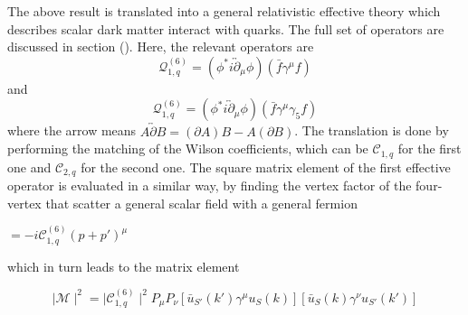 \documentclass[12pt]{article}
\begin{document}
The above result is translated into a general relativistic effective theory which describes scalar dark matter interact with quarks. The full set of operators are discussed in section (). Here, the relevant operators are
$$
\mathcal Q_{1,q}^{(6)} = (\phi^* i \overleftrightarrow\partial_\mu \phi ) ( \bar f \gamma^\mu f ) 
$$
and 
$$
\mathcal Q_{1,q}^{(6)} = (\phi^* i \overleftrightarrow\partial_\mu \phi ) ( \bar f \gamma^\mu\gamma_5 f ) 
$$
where the arrow means $A \overleftrightarrow\partial B= (\partial A)B-A(\partial B)$. The translation is done by performing the matching of the Wilson coefficients, which can be $ \mathcal  C_{1,q}$ for the first one and $\mathcal  C_{2,q}$  for the second one. 
The square matrix element of the first effective operator is evaluated in a similar way, by finding the vertex factor of the four-vertex that scatter a general scalar field with a general fermion
\begin{center}
$= -i  \mathcal C^{(6)}_{1,q} (p+p')^\mu$
\end{center}
which in turn leads to the matrix element
\begin{center}
\end{center}
$$
\mid \mathcal  M \mid^2 = \mid \mathcal  C_{1,q}^{(6)}  \mid^2 P_\mu P_\nu  [\bar u_{S'}(k')   \gamma^\mu  u_S(k)] [\bar u_{S}(k)   \gamma^\nu   u_{S'}(k')]
$$
\end{document}
